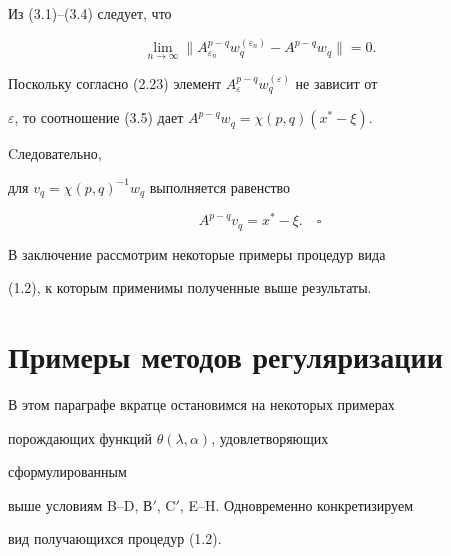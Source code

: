 Из (3.1)--(3.4) следует, что


\begin{equation}


\lim_{n\to\infty}\|A^{p-q}_{\varepsilon_n}


w^{(\varepsilon_n)}_q-A^{p-q}w_q\|=0.


\end{equation}


Поскольку согласно (2.23) элемент $A^{p-q}_\varepsilon 


w^{(\varepsilon)}_q$ не зависит от


$\varepsilon$, то соотношение (3.5) дает $A^{p-q}w_q=\chi(p,q)(x^*-\xi)$. 


Cледовательно, 


для $v_q=\chi(p,q)^{-1}w_q$ выполняется равенство


$$


A^{p-q}v_q=x^*-\xi.\quad\square


$$





В заключение рассмотрим некоторые примеры процедур вида 


(1.2), к которым применимы полученные выше результаты.





\section{Примеры методов регуляризации}





В этом параграфе вкратце остановимся на некоторых примерах 


порождающих функций $\theta(\lambda,\alpha)$, удовлетворяющих 


сформулированным 


выше условиям B--D, В$'$, C$'$, E--H. Одновременно конкретизируем 


вид получающихся процедур (1.2).





